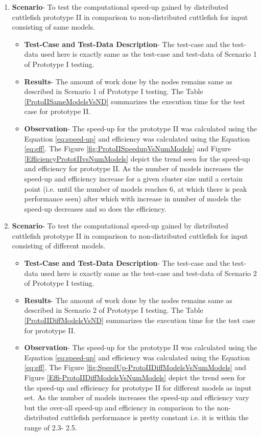\begin{enumerate}
\item{\textbf{Scenario}}- To test the computational speed-up gained by distributed cuttlefish prototype II in comparison to non-distributed cuttlefish for input consisting of same models.
\begin{itemize}
\item{\textbf{Test-Case and Test-Data Description}}- The test-case and the test-data used here is exactly same as the test-case and test-data of Scenario 1 of Prototype I testing.
\item{\textbf{Results}}- The amount of work done by the nodes remains same as described in Scenario 1 of Prototype I testing. The Table \ref{ProtoIISameModelsVsND} summarizes the execution time for the test case for prototype II.
\item{\textbf{Observation}}- The speed-up for the prototype II was calculated using the Equation \ref{eq:speed-up} and efficiency was calculated using the Equation \ref{eq:eff}. The Figure \ref{fig:ProtoIISpeedupVsNumModels} and Figure \ref{EfficiencyPrototIIvsNumModels} depict the trend seen for the speed-up and efficiency for prototype II. As the number of models increases the speed-up and efficiency increase for a given cluster size until a certain point (i.e. until the number of models reaches 6, at which there is peak performance seen) after which with increase in number of models the speed-up decreases and so does the efficiency.  
\end{itemize}

\item{\textbf{Scenario}}- To test the computational speed-up gained by distributed cuttlefish prototype II in comparison to non-distributed cuttlefish for input consisting of different models.
\begin{itemize}
\item{\textbf{Test-Case and Test-Data Description}}- The test-case and the test-data used here is exactly same as the test-case and test-data of Scenario 2 of Prototype I testing.
\item{\textbf{Results}}- The amount of work done by the nodes remains same as described in Scenario 2 of Prototype I testing. The Table \ref{ProtoIIDiffModelsVsND} summarizes the execution time for the test case for prototype II.
\item{\textbf{Observation}}-  The speed-up for the prototype II was calculated using the Equation \ref{eq:speed-up} and efficiency was calculated using the Equation \ref{eq:eff}. The Figure \ref{fig:SpeedUp-ProtoIIDiffModelsVsNumModels} and Figure \ref{Effi-ProtoIIDiffModelsVsNumModels} depict the trend seen for the speed-up and efficiency for prototype II for different models as input set. As the number of models increases the speed-up and efficiency vary but the over-all speed-up and efficiency in comparison to the non-distributed cuttlefish performance is pretty constant i.e. it is within the range of 2.3- 2.5.
\end{itemize}
\end{enumerate}


